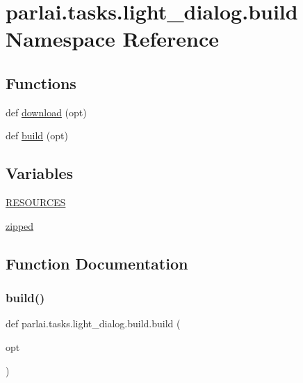 \hypertarget{namespaceparlai_1_1tasks_1_1light__dialog_1_1build}{}\section{parlai.\+tasks.\+light\+\_\+dialog.\+build Namespace Reference}
\label{namespaceparlai_1_1tasks_1_1light__dialog_1_1build}
\subsection*{Functions}
\begin{DoxyCompactItemize}
\item 
def \hyperlink{namespaceparlai_1_1tasks_1_1light__dialog_1_1build_af4e1d56472312e493c43483a2dfff5a3}{download} (opt)
\item 
def \hyperlink{namespaceparlai_1_1tasks_1_1light__dialog_1_1build_ac8ebc5da2dd660257535226b26afb26e}{build} (opt)
\end{DoxyCompactItemize}
\subsection*{Variables}
\begin{DoxyCompactItemize}
\item 
\hyperlink{namespaceparlai_1_1tasks_1_1light__dialog_1_1build_ab85c5847d6a7dabb0d18a66790034ced}{R\+E\+S\+O\+U\+R\+C\+ES}
\item 
\hyperlink{namespaceparlai_1_1tasks_1_1light__dialog_1_1build_a1e784322dcb5b89248388b7c2be41c87}{zipped}
\end{DoxyCompactItemize}


\subsection{Function Documentation}
\mbox{\label{namespaceparlai_1_1tasks_1_1light__dialog_1_1build_ac8ebc5da2dd660257535226b26afb26e}} 
\subsubsection{\texorpdfstring{build()}{build()}}
{\footnotesize\ttfamily def parlai.\+tasks.\+light\+\_\+dialog.\+build.\+build (\begin{DoxyParamCaption}\item[{}]{opt }\end{DoxyParamCaption})}



